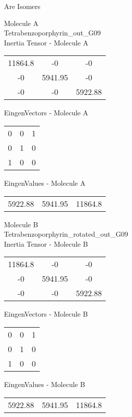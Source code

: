 \begin{center}
\vtab
\vtab
\textcolor{NavyBlue}{\Large Are Isomers}
\end{center}
\newpage
\begin{multicols}{2}
\begin{center}
Molecule A \\ 
Tetrabenzoporphyrin\_out\_G09
\\
Inertia Tensor - Molecule A \\
\vtab
\begin{tabular}{|c c c|}
11864.8	 & 	-0	 & 	-0	 \\
-0	 & 	5941.95	 & 	-0	 \\
-0	 & 	-0	 & 	5922.88
\end{tabular}

\vtab
 EingenVectors - Molecule A     \\
\vtab
\begin{tabular}{|c c c|}
0	 & 	0	 & 	1	 \\
0	 & 	1	 & 	0	 \\
1	 & 	0	 & 	0
\end{tabular}

\vtab
 EingenValues - Molecule A     \\
\vtab
\begin{tabular}{|c c c|}
5922.88	 & 	5941.95	 & 	11864.8
\end{tabular}
\columnbreak

Molecule B \\ 
Tetrabenzoporphyrin\_rotated\_out\_G09
\\
Inertia Tensor - Molecule B \\
\vtab
\begin{tabular}{|c c c|}
11864.8	 & 	-0	 & 	-0	 \\
-0	 & 	5941.95	 & 	-0	 \\
-0	 & 	-0	 & 	5922.88
\end{tabular}

\vtab
 EingenVectors - Molecule B     \\
\vtab
\begin{tabular}{|c c c|}
0	 & 	0	 & 	1	 \\
0	 & 	1	 & 	0	 \\
1	 & 	0	 & 	0
\end{tabular}

\vtab
 EingenValues - Molecule B     \\
\vtab
\begin{tabular}{|c c c|}
5922.88	 & 	5941.95	 & 	11864.8
\end{tabular}

\end{center}
\end{multicols}

